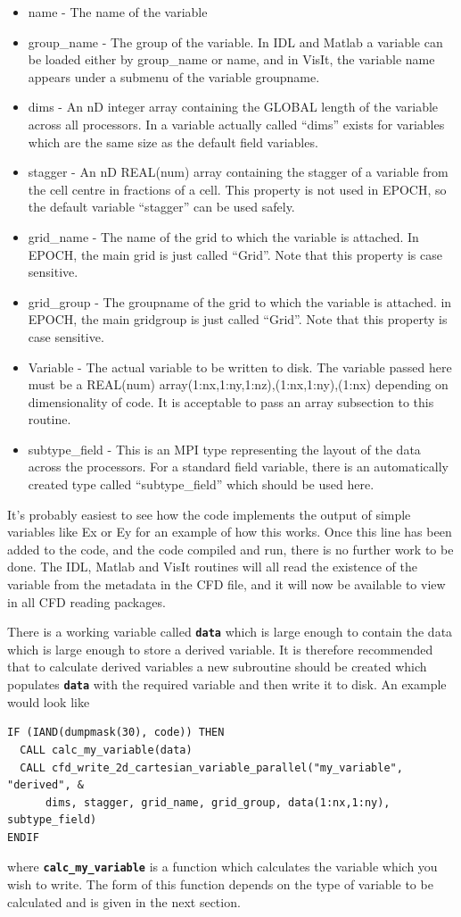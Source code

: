 \documentclass[12pt,a4paper]{article}
\newcommand{\simpleboxverbatim}{\begin{Verbatim}[obeytabs=true,frame=single,
  framerule=0.5mm,rulecolor=\color{warwickmid},formatcom=\color{black}]}
\newcommand{\inlinecode}[1]{{\color{warwickred} \bf\texttt{#1}}}
\newcommand{\EPOCH}{{\color{warwickdark}\fontfamily{phv}\selectfont{EPOCH}}}
\begin{document}
\begin{itemize}
\item name - The name of the variable
\item group\_name - The group of the variable. In IDL and Matlab a variable can
  be loaded either by group\_name or name, and in VisIt, the variable name
  appears under a submenu of the variable groupname.
\item dims - An nD integer array containing the GLOBAL length of the variable
  across all processors. In {\EPOCH} a variable actually called ``dims'' exists
  for variables which are the same size as the default field variables.
\item stagger - An nD REAL(num) array containing the stagger of a variable from
  the cell centre in fractions of a cell. This property is not used in EPOCH,
  so the default variable ``stagger'' can be used safely.
\item grid\_name - The name of the grid to which the variable is attached. In
  EPOCH, the main grid is just called ``Grid''. Note that this property is case
  sensitive.
\item grid\_group - The groupname of the grid to which the variable is
  attached. in EPOCH, the main gridgroup is just called ``Grid''. Note that
  this property is case sensitive.
\item Variable - The actual variable to be written to disk. The variable passed
  here must be a REAL(num) array(1:nx,1:ny,1:nz),(1:nx,1:ny),(1:nx) depending
  on dimensionality of code. It is acceptable to pass an array subsection to
  this routine.
\item subtype\_field - This is an MPI type representing the layout of the data
  across the processors. For a standard field variable, there is an
  automatically created type called ``subtype\_field'' which should be used
  here.
\end{itemize}

It's probably easiest to see how the code implements the output of simple
variables like Ex or Ey for an example of how this works. Once this line has
been added to the code, and the code compiled and run, there is no further work
to be done. The IDL, Matlab and VisIt routines will all read the existence of
the variable from the metadata in the CFD file, and it will now be available to
view in all CFD reading packages.

There is a working variable called \inlinecode{data} which is large enough to
contain the data which is large enough to store a derived variable. It is
therefore recommended that to calculate derived variables a new subroutine
should be created which populates \inlinecode{data} with the required variable
and then write it to disk. An example would look like
\simpleboxverbatim
IF (IAND(dumpmask(30), code)) THEN
  CALL calc_my_variable(data)
  CALL cfd_write_2d_cartesian_variable_parallel("my_variable", "derived", &
      dims, stagger, grid_name, grid_group, data(1:nx,1:ny), subtype_field)
ENDIF
\end{Verbatim}
where \inlinecode{calc\_my\_variable} is a function which calculates the
variable which you wish to write. The form of this function depends on the type
of variable to be calculated and is given in the next section.
\end{document}
